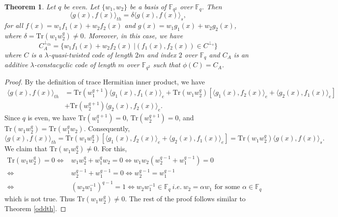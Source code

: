 \documentclass[12 pt]{extarticle}
\numberwithin{equation}{section}
\newtheorem{theorem}{Theorem}[section]
\theoremstyle{definition}
\begin{document}
\begin{theorem}\label{qeventh}
Let $q$ be even. Let $\{w_1,w_2\}$ be a basis of $\mathbb{F}_{q^2}$ over $\mathbb{F}_q$.  Then 
 $$\langle g(x),f(x)\rangle_{th} =\delta\langle g(x),f(x)\rangle_s,$$   for all $f(x)=w_1f_1(x)+w_2f_2(x)$ and $g(x)=w_1g_1(x)+w_2g_2(x)$, where $\delta=\text{Tr}(w_1w_2^q)\neq 0$.  Moreover, in this case, we have  $$C_A^{\perp_{th}}=\{w_1f_1(x)+w_2f_2(x)\ | (f_1(x),f_2(x))\in C^{\perp_s}\}$$
where $C$ is a $\lambda$-quasi-twisted code of length $2m$ and index $2$ over $\mathbb{F}_q$ and $C_A$ is an additive $\lambda$-constacyclic code of length $m$ over $\mathbb{F}_{q^2}$ such that  $\phi(C)=C_A$.
\end{theorem}
\begin{proof}
    By the definition of trace Hermitian inner product, we have
 \begin{equation*}
     \begin{split}
        \langle g(x),f(x)\rangle_{th} &=\text{Tr}(w_1^{q+1})\langle g_1(x),f_1(x)\rangle_e +\text{Tr}(w_1w_2^q)[\langle g_1(x),f_2(x)\rangle_e+
    \langle g_2(x),f_1(x)\rangle_e]\\
    &+\text{Tr}(w_2^{q+1})\langle g_2(x),f_2(x)\rangle_e. 
     \end{split}
 \end{equation*}
  Since $q$ is even, we have  $\text{Tr}(w_1^{q+1})=0$, $\text{Tr}(w_2^{q+1})=0$, and $\text{Tr}(w_1w_2^q)=\text{Tr}(w_1^qw_2)$. Consequently,  $$\langle g(x),f(x)\rangle_{th} =\text{Tr}(w_1w_2^q)[\langle g_1(x),f_2(x)\rangle_e+
    \langle g_2(x),f_1(x)\rangle_e]=\text{Tr}(w_1w_2^q)\langle g(x),f(x)\rangle_s.$$ 
  We claim that $\text{Tr}(w_1w_2^q)\neq0$. For this,  
  \begin{equation*}
      \begin{split}
          \text{Tr}(w_1w_2^q)=0 \iff& w_1w_2^q+w_1^qw_2=0 \iff w_1w_2(w_2^{q-1}+w_1^{q-1})=0\\
          \iff& w_2^{q-1}+w_1^{q-1}=0\iff w_2^{q-1}=w_1^{q-1}\\
         \iff& (w_2w_1^{-1})^{q-1}=1\iff w_2w_1^{-1}\in \mathbb{F}_q \ i.e. \ w_2=\alpha w_1
 \text{ for some } \alpha\in \mathbb{F}_q
 \end{split}
  \end{equation*}
  which is not true. Thus $\text{Tr}(w_1w_2^q)\neq0$.
  The rest of the proof follows similar to Theorem \ref{oddth}.
\end{proof}
\end{document}
